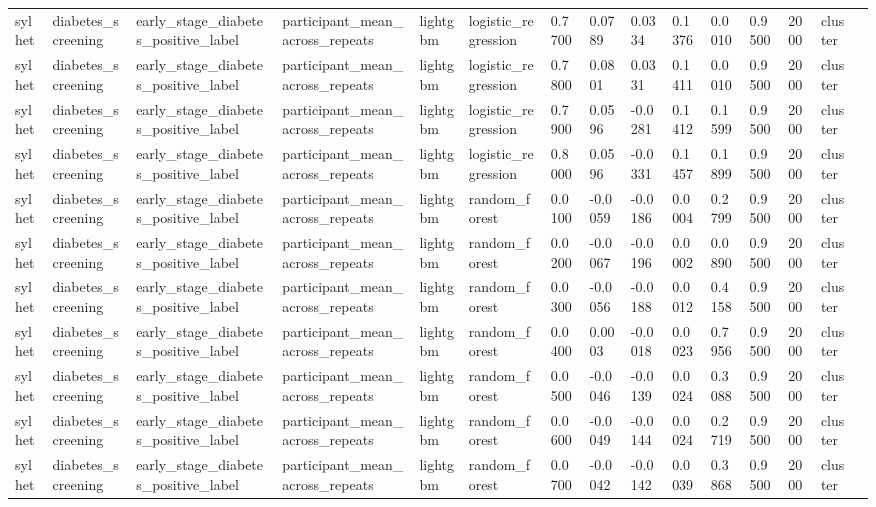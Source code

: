 \begin{tabular}{lllllllllllllll}
sylhet & diabetes\_screening & early\_stage\_diabetes\_positive\_label & participant\_mean\_across\_repeats & lightgbm & logistic\_regression & 0.7700 & 0.0789 & 0.0334 & 0.1376 & 0.0010 & 0.9500 & 2000 & cluster &  \\
sylhet & diabetes\_screening & early\_stage\_diabetes\_positive\_label & participant\_mean\_across\_repeats & lightgbm & logistic\_regression & 0.7800 & 0.0801 & 0.0331 & 0.1411 & 0.0010 & 0.9500 & 2000 & cluster &  \\
sylhet & diabetes\_screening & early\_stage\_diabetes\_positive\_label & participant\_mean\_across\_repeats & lightgbm & logistic\_regression & 0.7900 & 0.0596 & -0.0281 & 0.1412 & 0.1599 & 0.9500 & 2000 & cluster &  \\
sylhet & diabetes\_screening & early\_stage\_diabetes\_positive\_label & participant\_mean\_across\_repeats & lightgbm & logistic\_regression & 0.8000 & 0.0596 & -0.0331 & 0.1457 & 0.1899 & 0.9500 & 2000 & cluster &  \\
sylhet & diabetes\_screening & early\_stage\_diabetes\_positive\_label & participant\_mean\_across\_repeats & lightgbm & random\_forest & 0.0100 & -0.0059 & -0.0186 & 0.0004 & 0.2799 & 0.9500 & 2000 & cluster &  \\
sylhet & diabetes\_screening & early\_stage\_diabetes\_positive\_label & participant\_mean\_across\_repeats & lightgbm & random\_forest & 0.0200 & -0.0067 & -0.0196 & 0.0002 & 0.0890 & 0.9500 & 2000 & cluster &  \\
sylhet & diabetes\_screening & early\_stage\_diabetes\_positive\_label & participant\_mean\_across\_repeats & lightgbm & random\_forest & 0.0300 & -0.0056 & -0.0188 & 0.0012 & 0.4158 & 0.9500 & 2000 & cluster &  \\
sylhet & diabetes\_screening & early\_stage\_diabetes\_positive\_label & participant\_mean\_across\_repeats & lightgbm & random\_forest & 0.0400 & 0.0003 & -0.0018 & 0.0023 & 0.7956 & 0.9500 & 2000 & cluster &  \\
sylhet & diabetes\_screening & early\_stage\_diabetes\_positive\_label & participant\_mean\_across\_repeats & lightgbm & random\_forest & 0.0500 & -0.0046 & -0.0139 & 0.0024 & 0.3088 & 0.9500 & 2000 & cluster &  \\
sylhet & diabetes\_screening & early\_stage\_diabetes\_positive\_label & participant\_mean\_across\_repeats & lightgbm & random\_forest & 0.0600 & -0.0049 & -0.0144 & 0.0024 & 0.2719 & 0.9500 & 2000 & cluster &  \\
sylhet & diabetes\_screening & early\_stage\_diabetes\_positive\_label & participant\_mean\_across\_repeats & lightgbm & random\_forest & 0.0700 & -0.0042 & -0.0142 & 0.0039 & 0.3868 & 0.9500 & 2000 & cluster &  \\

\end{tabular}
